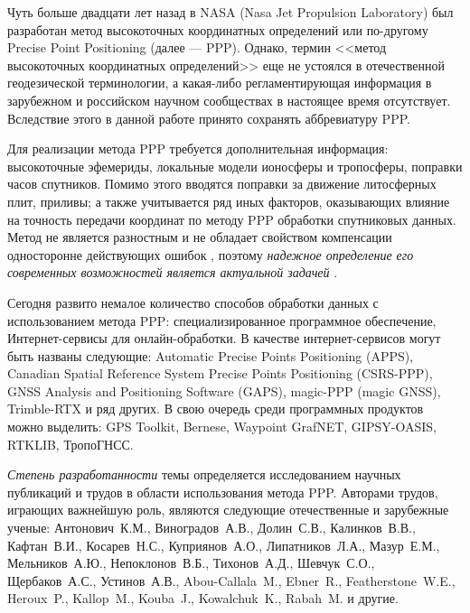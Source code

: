 Чуть больше двадцати лет назад в NASA (Nasa Jet Propulsion Laboratory) был разработан метод высокоточных координатных определений или по-другому Precise Point Positioning (далее --- PPP). Однако, термин <<метод высокоточных координатных определений>> еще не устоялся в отечественной геодезической терминологии, а какая-либо регламентирующая информация в зарубежном и российском научном сообществах в настоящее время отсутствует. Вследствие этого в данной работе принято сохранять аббревиатуру PPP. 

Для реализации метода PPP требуется дополнительная информация: высокоточные эфемериды, локальные модели ионосферы и тропосферы, поправки часов спутников. Помимо этого вводятся поправки за движение литосферных плит, приливы; а также учитывается ряд иных факторов, оказывающих влияние на точность передачи координат по методу PPP обработки спутниковых данных.  Метод не является разностным и не обладает свойством компенсации односторонне действующих ошибок
, поэтому \textit{надежное определение его современных возможностей является актуальной задачей}%
.


Сегодня развито немалое количество способов обработки данных с использованием метода PPP: специализированное программное обеспечение, Интернет-сервисы для онлайн-обработки. В качестве интернет-сервисов могут быть названы следующие: Automatic Precise Points Positioning (APPS), Canadian Spatial Reference System Precise Points Positioning (CSRS-PPP), GNSS Analysis and Positioning Software (GAPS), magic-PPP (magic GNSS), Trimble-RTX и ряд других. В свою очередь среди программных продуктов можно выделить: GPS Toolkit, Bernese, Waypoint GrafNET, GIPSY-OASIS, RTKLIB, ТропоГНСС.

\textit{Степень разработанности} темы определяется исследованием научных публикаций и трудов в области использования метода PPP. Авторами трудов, играющих важнейшую роль, являются следующие отечественные и зарубежные ученые: Антонович~К.М., Виноградов~А.В., Долин~С.В., Калинков~В.В., Кафтан~В.И., Косарев~Н.С., Куприянов~А.О., Липатников~Л.А., Мазур~Е.М., Мельников~А.Ю., Непоклонов~В.Б., Тихонов~А.Д., Шевчук~С.О., Щербаков~А.С., Устинов~А.В., Abou-Callala~M., Ebner~R.,  Featherstone~W.E., Heroux~P., Kallop~M., Kouba~J.,  Kowalchuk~K., Rabah~M. и другие.

